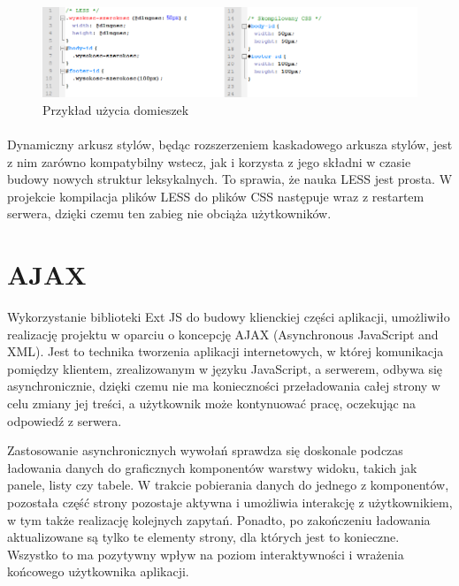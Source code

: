 \begin{figure}[h]
	\centering
	\includegraphics[width=1.00\textwidth]{images/less2.png}
	\caption{Przykład użycia domieszek}
\end{figure}
\paragraph{}

Dynamiczny arkusz stylów, będąc rozszerzeniem kaskadowego arkusza stylów, jest z nim zarówno kompatybilny wstecz, jak i korzysta z jego składni w czasie budowy nowych struktur leksykalnych. To sprawia, że nauka LESS jest prosta.
W projekcie kompilacja plików LESS do plików CSS następuje wraz z restartem serwera, dzięki czemu ten zabieg nie obciąża użytkowników. \cite{LESS}


\section{AJAX}
Wykorzystanie biblioteki Ext JS do budowy klienckiej części aplikacji, umożliwiło realizację projektu w oparciu o koncepcję AJAX (Asynchronous JavaScript and XML). Jest to technika tworzenia aplikacji internetowych, w której komunikacja pomiędzy klientem, zrealizowanym w języku JavaScript, a serwerem, odbywa się asynchronicznie, dzięki czemu nie ma konieczności przeładowania całej strony w celu zmiany jej treści, a użytkownik może kontynuować pracę, oczekując na odpowiedź z serwera.\cite{ajaxWoj}

Zastosowanie asynchronicznych wywołań sprawdza się doskonale podczas ładowania danych do graficznych komponentów warstwy widoku, takich jak panele, listy czy tabele. W trakcie pobierania danych do jednego z komponentów, pozostała część strony pozostaje aktywna i umożliwia interakcję z użytkownikiem, w tym także realizację kolejnych zapytań. Ponadto, po zakończeniu ładowania aktualizowane są tylko te elementy strony, dla których jest to konieczne. Wszystko to ma pozytywny wpływ na poziom interaktywności i wrażenia końcowego użytkownika aplikacji.

